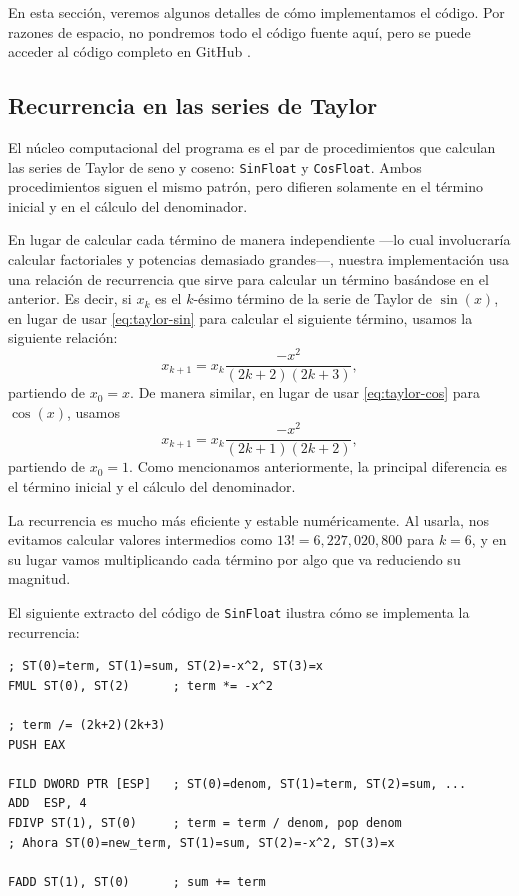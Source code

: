 \documentclass[12pt]{article}
\begin{document}
En esta sección, veremos algunos detalles de cómo implementamos el código. Por
razones de espacio, no pondremos todo el código fuente aquí, pero se puede
acceder al código completo en GitHub \parencite{ASMCode}.

\subsection{Recurrencia en las series de Taylor}

El núcleo computacional del programa es el par de procedimientos que calculan
las series de Taylor de seno y coseno: \texttt{SinFloat} y \texttt{CosFloat}.
Ambos procedimientos siguen el mismo patrón, pero difieren solamente en el
término inicial y en el cálculo del denominador.

En lugar de calcular cada término de manera independiente ---lo cual
involucraría calcular factoriales y potencias demasiado grandes---, nuestra
implementación usa una relación de recurrencia que sirve para calcular un
término basándose en el anterior. Es decir, si $x_k$ es el $k$-ésimo término de
la serie de Taylor de $\sin(x)$, en lugar de usar \eqref{eq:taylor-sin} para
calcular el siguiente término, usamos la siguiente relación:
\begin{equation}
  x_{k+1} = x_{k} \frac{-x^2}{(2k+2)(2k+3)},
\end{equation}
partiendo de $x_0 = x$. De manera similar, en lugar de usar
\eqref{eq:taylor-cos} para $\cos(x)$, usamos
\begin{equation}
  x_{k+1} = x_{k} \frac{-x^2}{(2k+1)(2k+2)},
\end{equation}
partiendo de $x_0 = 1$. Como mencionamos anteriormente, la principal diferencia
es el término inicial y el cálculo del denominador.

La recurrencia es mucho más eficiente y estable numéricamente. Al usarla, nos
evitamos calcular valores intermedios como $13! = 6,227,020,800$ para $k=6$, y
en su lugar vamos multiplicando cada término por algo que va reduciendo su
magnitud.

El siguiente extracto del código de \texttt{SinFloat} ilustra cómo se
implementa la recurrencia:
\begin{lstlisting}[language={[x86masm]Assembler}]
; ST(0)=term, ST(1)=sum, ST(2)=-x^2, ST(3)=x
FMUL ST(0), ST(2)      ; term *= -x^2

; term /= (2k+2)(2k+3)
PUSH EAX

FILD DWORD PTR [ESP]   ; ST(0)=denom, ST(1)=term, ST(2)=sum, ...
ADD  ESP, 4
FDIVP ST(1), ST(0)     ; term = term / denom, pop denom
; Ahora ST(0)=new_term, ST(1)=sum, ST(2)=-x^2, ST(3)=x

FADD ST(1), ST(0)      ; sum += term
\end{lstlisting}
\end{document}

